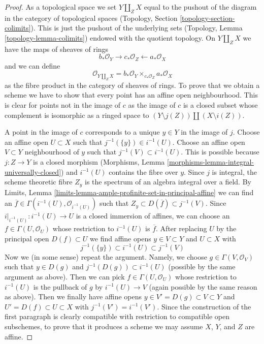 \begin{proof}
As a topological space we set $Y \amalg_Z X$ equal to the pushout of
the diagram in the category of topological spaces (Topology, Section
\ref{topology-section-colimits}). This is just the pushout
of the underlying sets (Topology, Lemma \ref{topology-lemma-colimits})
endowed with the quotient topology.
On $Y \amalg_Z X$ we have the maps of sheaves of rings
$$
b_*\mathcal{O}_Y \longrightarrow c_*\mathcal{O}_Z
\longleftarrow a_*\mathcal{O}_X
$$
and we can define
$$
\mathcal{O}_{Y \amalg_Z X} =
b_*\mathcal{O}_Y \times_{c_*\mathcal{O}_Z} a_*\mathcal{O}_X
$$
as the fibre product in the category of sheaves of rings. To prove that we
obtain a scheme we have to show that every point has an
affine open neighbourhood. This is clear for points not in the image of $c$
as the image of $c$ is a closed subset whose complement is
isomorphic as a ringed space to $(Y \setminus j(Z)) \amalg (X \setminus i(Z))$.

\medskip\noindent
A point in the image of $c$ corresponds to a unique $y \in Y$
in the image of $j$. Choose an affine open $U \subset X$
such that $j^{-1}(\{y\}) \in i^{-1}(U)$.
Choose an affine open $V \subset Y$ neighbourhood of $y$
such that $j^{-1}(V) \subset i^{-1}(U)$.
This is possible because $j : Z \to Y$ is a closed morphism
(Morphisms, Lemma \ref{morphisms-lemma-integral-universally-closed}) and
$i^{-1}(U)$ contains the fibre over $y$.
Since $j$ is integral, the scheme theoretic fibre $Z_y$
is the spectrum of an algebra integral over a field.
By Limits, Lemma \ref{limits-lemma-ample-profinite-set-in-principal-affine}
we can find an $\overline{f} \in \Gamma(i^{-1}(U), \mathcal{O}_{i^{-1}(U)})$
such that $Z_y \subset D(\overline{f}) \subset j^{-1}(V)$.
Since $i|_{i^{-1}(U)} : i^{-1}(U) \to U$ is a closed immersion
of affines, we can choose an $f \in \Gamma(U, \mathcal{O}_U)$
whose restriction to $i^{-1}(U)$ is $\overline{f}$.
After replacing $U$ by the principal open $D(f) \subset U$
we find affine opens $y \in V \subset Y$ and $U \subset X$ with
$$
j^{-1}(\{y\}) \subset i^{-1}(U) \subset j^{-1}(V)
$$
Now we (in some sense) repeat the argument. Namely, we choose
$g \in \Gamma(V, \mathcal{O}_V)$ such that $y \in D(g)$ and
$j^{-1}(D(g)) \subset i^{-1}(U)$ (possible by the same argument
as above). Then we can pick $f \in \Gamma(U, \mathcal{O}_U)$
whose restriction to $i^{-1}(U)$ is the pullback of $g$
by $i^{-1}(U) \to V$ (again possible by the same reason as above).
Then we finally have affine opens $y \in V' = D(g) \subset V \subset Y$
and $U' = D(f) \subset U \subset X$ with $j^{-1}(V') = i^{-1}(V')$.
Since the construction of the first paragraph is clearly compatible
with restriction to compatible open subschemes, to prove that it
produces a scheme we may assume $X$, $Y$, and $Z$ are affine.


\end{proof}
